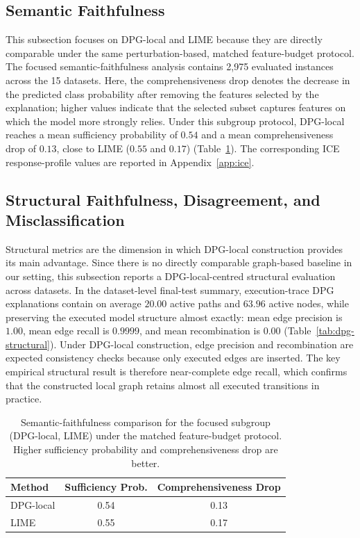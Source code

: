\documentclass[runningheads]{llncs}
\begin{document}
\subsection{Semantic Faithfulness}

This subsection focuses on DPG-local and LIME because they are directly
comparable under the same perturbation-based, matched feature-budget protocol. The focused semantic-faithfulness analysis contains 2,975 evaluated instances across the 15 datasets. Here, the comprehensiveness drop denotes the decrease in the predicted class
probability after removing the features selected by the explanation; higher
values indicate that the selected subset captures features on which the model
more strongly relies. Under this subgroup protocol, DPG-local reaches a mean
sufficiency probability of $0.54$ and a mean comprehensiveness drop of $0.13$,
close to LIME ($0.55$ and $0.17$) (Table~\ref{tab:semantic-faithfulness}). The corresponding ICE response-profile values are reported in Appendix~\ref{app:ice}.


\subsection{Structural Faithfulness, Disagreement, and Misclassification}

Structural metrics are the dimension in which DPG-local construction provides its main advantage. Since there is no directly comparable graph-based baseline in our setting, this subsection reports a DPG-local-centred structural evaluation across datasets. In the dataset-level final-test summary, execution-trace DPG explanations contain on average $20.00$ active paths and $63.96$ active nodes, while preserving the executed model structure almost exactly: mean edge precision is $1.00$, mean edge recall is $0.9999$, and mean recombination is $0.00$ (Table~\ref{tab:dpg-structural}). Under DPG-local construction, edge precision and recombination are expected consistency checks because only executed edges are inserted. The key empirical structural result is therefore near-complete edge recall, which confirms that the constructed local graph retains almost all executed transitions in practice.


\begin{table}[ht!]
  \centering
  \small
  \caption{Semantic-faithfulness comparison for the focused subgroup
    (DPG-local, LIME) under the matched feature-budget protocol. Higher
    sufficiency probability and comprehensiveness drop are better.}
  \label{tab:semantic-faithfulness}
  \begin{tabular}{lcc}
    \toprule
    Method                    & Sufficiency Prob. & Comprehensiveness Drop \\
    \midrule
    DPG-local & 0.54             & 0.13 \\
    LIME                      & 0.55             & 0.17 \\
    \bottomrule
  \end{tabular}
\end{table}
\end{document}
